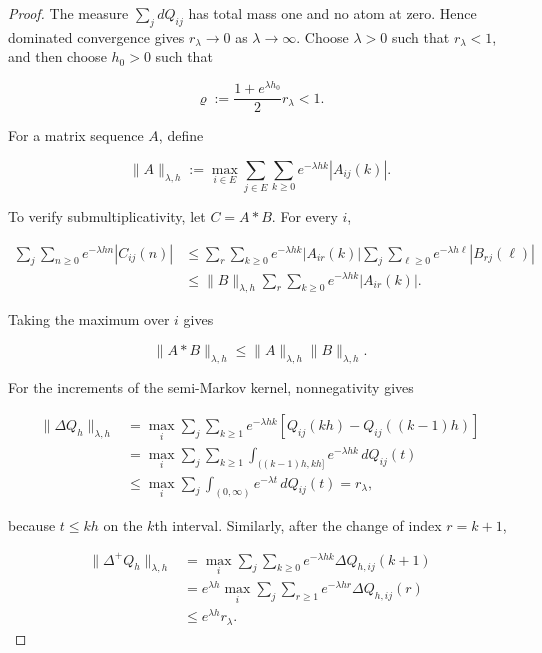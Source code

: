 \documentclass[3p,12pt,authoryear]{elsarticle}
\theoremstyle{definition}
\theoremstyle{remark}
\begin{document}
\begin{proof}
The measure $\sum_jdQ_{ij}$ has total mass one and no atom at zero. Hence dominated convergence gives $r_\lambda\to0$ as $\lambda\to\infty$. Choose $\lambda>0$ such that $r_\lambda<1$, and then choose $h_0>0$ such that

\begin{equation*}
\varrho
:=
\frac{1+e^{\lambda h_0}}{2}r_\lambda
<1.
\end{equation*}

For a matrix sequence $A$, define

\begin{equation*}
\|A\|_{\lambda,h}
:=
\max_{i\in E}
\sum_{j\in E}
\sum_{k\geq0}e^{-\lambda hk}|A_{ij}(k)|.
\end{equation*}

To verify submultiplicativity, let $C=A*B$. For every $i$,

\begin{equation*}
\begin{aligned}
\sum_j\sum_{n\geq0}e^{-\lambda hn}|C_{ij}(n)|
&\leq
\sum_{r}\sum_{k\geq0}e^{-\lambda hk}|A_{ir}(k)|
\sum_j\sum_{\ell\geq0}e^{-\lambda h\ell}|B_{rj}(\ell)|\\
&\leq
\|B\|_{\lambda,h}
\sum_r\sum_{k\geq0}e^{-\lambda hk}|A_{ir}(k)|.
\end{aligned}
\end{equation*}

Taking the maximum over $i$ gives

\begin{equation*}
\|A*B\|_{\lambda,h}
\leq
\|A\|_{\lambda,h}\|B\|_{\lambda,h}.
\end{equation*}

For the increments of the semi-Markov kernel, nonnegativity gives

\begin{equation*}
\begin{aligned}
\|\Delta Q_h\|_{\lambda,h}
&=
\max_i\sum_j\sum_{k\geq1}e^{-\lambda hk}
\left[Q_{ij}(kh)-Q_{ij}((k-1)h)\right]\\
&=
\max_i\sum_j\sum_{k\geq1}
\int_{((k-1)h,kh]}e^{-\lambda hk}\,dQ_{ij}(t)\\
&\leq
\max_i\sum_j\int_{(0,\infty)}e^{-\lambda t}\,dQ_{ij}(t)
=r_\lambda,
\end{aligned}
\end{equation*}

because $t\leq kh$ on the $k$th interval. Similarly, after the change of index $r=k+1$,

\begin{equation*}
\begin{aligned}
\|\Delta^+Q_h\|_{\lambda,h}
&=
\max_i\sum_j\sum_{k\geq0}e^{-\lambda hk}\Delta Q_{h,ij}(k+1)\\
&=e^{\lambda h}
\max_i\sum_j\sum_{r\geq1}e^{-\lambda hr}\Delta Q_{h,ij}(r)\\
&\leq e^{\lambda h}r_\lambda.
\end{aligned}
\end{equation*}


\end{proof}
\end{document}
